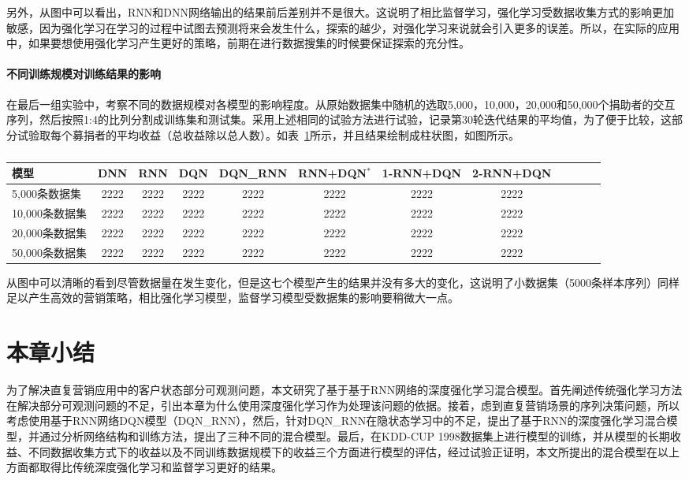 另外，从图中可以看出，RNN和DNN网络输出的结果前后差别并不是很大。这说明了相比监督学习，强化学习受数据收集方式的影响更加敏感，因为强化学习在学习的过程中试图去预测将来会发生什么，探索的越少，对强化学习来说就会引入更多的误差。所以，在实际的应用中，如果要想使用强化学习产生更好的策略，前期在进行数据搜集的时候要保证探索的充分性。

\paragraph{不同训练规模对训练结果的影响}

在最后一组实验中，考察不同的数据规模对各模型的影响程度。从原始数据集中随机的选取5,000，10,000，20,000和50,000个捐助者的交互序列，然后按照1:4的比列分割成训练集和测试集。采用上述相同的试验方法进行试验，记录第30轮迭代结果的平均值，为了便于比较，这部分试验取每个募捐者的平均收益（总收益除以总人数）。如表~\ref{tab:4result3}所示，并且结果绘制成柱状图，如图所示。
 \begin{table}[htbp]
  \centering
  \footnotesize
  \caption{}
  \label{tab:4result3}
  \begin{tabular}{lccccccccccc}  
     \toprule
      模型 &DNN&RNN&DQN&DQN_RNN&RNN+DQN$^{*}$&1-RNN+DQN&2-RNN+DQN\\
    \midrule
      5,000条数据集 &2222&2222&2222&2222&2222&2222&2222&\\
      10,000条数据集 &2222&2222&2222&2222&2222&2222&2222&\\
      20,000条数据集 &2222&2222&2222&2222&2222&2222&2222&\\
      50,000条数据集 &2222&2222&2222&2222&2222&2222&2222&\\
    \bottomrule
  \end{tabular}
\end{table}

从图中可以清晰的看到尽管数据量在发生变化，但是这七个模型产生的结果并没有多大的变化，这说明了小数据集（5000条样本序列）同样足以产生高效的营销策略，相比强化学习模型，监督学习模型受数据集的影响要稍微大一点。


\section{本章小结}
为了解决直复营销应用中的客户状态部分可观测问题，本文研究了基于基于RNN网络的深度强化学习混合模型。首先阐述传统强化学习方法在解决部分可观测问题的不足，引出本章为什么使用深度强化学习作为处理该问题的依据。接着，虑到直复营销场景的序列决策问题，所以考虑使用基于RNN网络DQN模型（DQN_RNN），然后，针对DQN_RNN在隐状态学习中的不足，提出了基于RNN的深度强化学习混合模型，并通过分析网络结构和训练方法，提出了三种不同的混合模型。最后，在KDD-CUP 1998数据集上进行模型的训练，并从模型的长期收益、不同数据收集方式下的收益以及不同训练数据规模下的收益三个方面进行模型的评估，经过试验正证明，本文所提出的混合模型在以上方面都取得比传统深度强化学习和监督学习更好的结果。